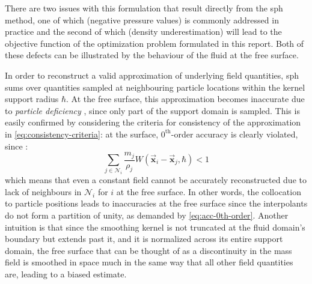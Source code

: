 \documentclass[conference]{IEEEtran}
\newcommand\vek[1]{\vec{\bm{#1}}}
\newcommand\mat[1]{{\mathds{#1}}}
\newcommand\br[1]{\left(#1\right)}
\newcommand\abr[1]{\left\langle#1\right\rangle}
\DeclareMathOperator*{\argmin}{\arg\!\min}
\newcommand\divergence{{\nabla\cdot}}
\begin{document}



There are two issues with this formulation that result directly from the \ac{sph} method, one of which (negative pressure values) is commonly addressed in practice and the second of which (density underestimation) will lead to the objective function of the optimization problem formulated in this report. Both of these defects can be illustrated by the behaviour of the fluid at the free surface. 

In order to reconstruct a valid approximation of underlying field quantities, \ac{sph} sums over quantities sampled at neighbouring particle locations within the kernel support radius $\hbar$. At the free surface, this approximation becomes inaccurate due to \textit{particle deficiency} \cite{tutorial2019}, since only part of the support domain is sampled. This is easily confirmed by considering the criteria for consistency of the approximation in \autoref{eq:consistency-criteria}: at the surface, $0^\text{th}$-order accuracy is clearly violated, since \cite{liu2010}:
\begin{equation}
  \sum_{j\in\mathcal{N}_i} \frac{m_j}{\rho_j} W\br{\vek{x}_i-
  \vek{x}_j, \hbar} < 1
\end{equation} 
which means that even a constant field cannot be accurately reconstructed due to lack of neighbours in $\mathcal{N}_i$ for $i$ at the free surface. In other words, the collocation to particle positions leads to inaccuracies at the free surface since the interpolants do not form a partition of unity, as demanded by \autoref{eq:acc-0th-order}. Another intuition is that since the smoothing kernel is not truncated at the fluid domain's boundary but extends past it, and it is normalized across its entire support domain, the free surface that can be thought of as a discontinuity in the mass field is smoothed in space much in the same way that all other field quantities are, leading to a biased estimate. 
\end{document}
